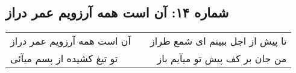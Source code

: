 \begin{center}
\section*{شماره ۱۴: آن است همه آرزویم عمر دراز}
\label{sec:014}
\begin{longtable}{l p{0.5cm} r}
آن است همه آرزویم عمر دراز
&&
تا پیش از اجل ببینم ای شمع طراز
\\
تو تیغ کشیده از پسم میآئی
&&
من جان بر کف پیش تو میآیم باز
\\
\end{longtable}
\end{center}
